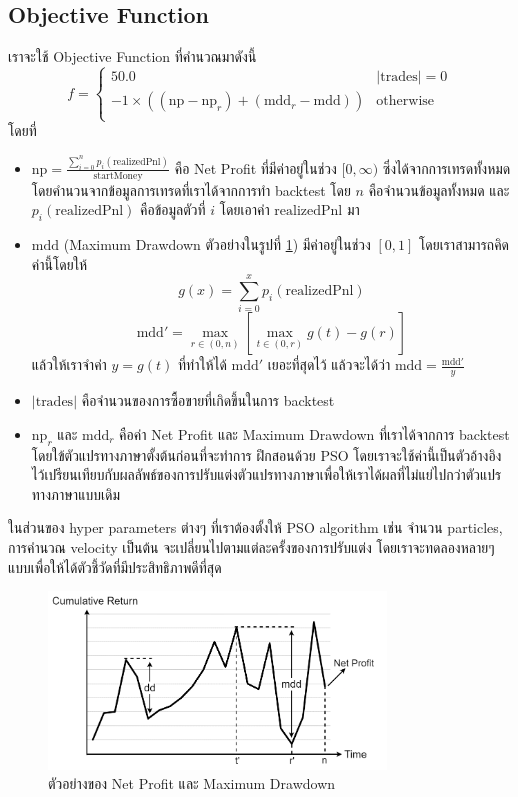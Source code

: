 \subsection{Objective Function}
เราจะใช้ Objective Function ที่คำนวณมาดังนี้ 
$$ f = 
\begin{cases}
    50.0 & |\text{trades}| = 0 \\
    -1 \times ((\text{np} - \text{np}_r) + (\text{mdd}_r - \text{mdd})) & \text{otherwise} \\ 
\end{cases}
$$ 
โดยที่
\begin{itemize}
    \item {$\text{np} = \frac{\sum_{i=0}^{n} p_i(\text{realizedPnl})}{\text{startMoney}}$ 
        คือ Net Profit ที่มีค่าอยู่ในช่วง $[0, \infty)$ ซึ่งได้จากการเทรดทั้งหมดโดยคำนวนจากข้อมูลการเทรดที่เราได้จากการทำ backtest โดย $n$ คือจำนวนข้อมูลทั้งหมด
        และ $p_i(\text{realizedPnl})$ คือข้อมูลตัวที่ $i$ โดยเอาค่า $\text{realizedPnl}$ มา 
    }
    \item {$\text{mdd}$ (Maximum Drawdown ตัวอย่างในรูปที่ \ref{fig:10}) มีค่าอยู่ในช่วง $[0, 1]$ โดยเราสามารถคิดค่านี้โดยให้ 
    $$
        g(x) = \sum_{i = 0}^{x}p_i(\text{realizedPnl})
    $$
    \begin{equation}
        \text{mdd}' = \max_{r \in (0, n)} \left[ \max_{t \in (0, r)} g(t) - g(r) \right]
    \end{equation}
    แล้วให้เราจำค่า $y = g(t)$ ที่ทำให้ได้ 
    $\text{mdd}'$ เยอะที่สุดไว้ แล้วจะได้ว่า $\text{mdd} = \frac{\text{mdd}'}{y}$
    }
    \item {$|\text{trades}|$ คือจำนวนของการซื้อขายที่เกิดขึ้นในการ backtest}
    \item {$\text{np}_r$ และ  $\text{mdd}_r$ คือค่า Net Profit และ Maximum Drawdown ที่เราได้จากการ backtest โดยใข้ตัวแปรทางภาษาตั้งต้นก่อนที่จะทำการ
    ฝึกสอนด้วย PSO โดยเราจะใช้ค่านี้เป็นตัวอ้างอิงไว้เปรียนเทียบกับผลลัพธ์ของการปรับแต่งตัวแปรทางภาษาเพื่อให้เราได้ผลที่ไม่แย่ไปกว่าตัวแปรทางภาษาแบบเดิม
    }
\end{itemize}
ในส่วนของ hyper parameters ต่างๆ ที่เราต้องตั้งให้ PSO algorithm เช่น จำนวน particles, การคำนวณ velocity เป็นต้น จะเปลี่ยนไปตามแต่ละครั้งของการปรับแต่ง 
โดยเราจะทดลองหลายๆ แบบเพื่อให้ได้ตัวชี้วัดที่มีประสิทธิภาพดีที่สุด

\begin{figure}[ht]
    \centering
    \includegraphics[width=0.8\textwidth]{images/mdd.png}
    \caption{ตัวอย่างของ Net Profit และ Maximum Drawdown}
    \label{fig:10}
\end{figure}

